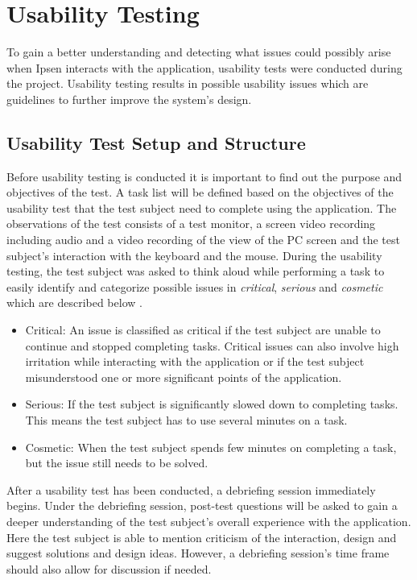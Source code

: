 \documentclass[../../master.tex]{subfiles}
\begin{document}
\section{Usability Testing} \label{sec:usabilitytesting}

To gain a better understanding and detecting what issues could possibly arise when Ipsen interacts with the application, usability tests were conducted during the project.
Usability testing results in possible usability issues which are guidelines to further improve the system's design.

\subsection{Usability Test Setup and Structure}
Before usability testing is conducted it is important to find out the purpose and objectives of the test.
A task list will be defined based on the objectives of the usability test that the test subject need to complete using the application.
The observations of the test consists of a test monitor, a screen video recording including audio and a video recording of the view of the PC screen and the test subject's interaction with the keyboard and the mouse.
During the usability testing, the test subject was asked to think aloud while performing a task to easily identify and categorize possible issues in \textit{critical}, \textit{serious} and \textit{cosmetic} which are described below \cite{brugervenligtwebdesign}.

\begin{itemize}
  	\item
  	Critical: An issue is classified as critical if the test subject are unable to continue and stopped completing tasks.
	Critical issues can also involve high irritation while interacting with the application or if the test subject misunderstood one or more significant points of the application.
  	\item
  	Serious: If the test subject is significantly slowed down to completing tasks.
	This means the test subject has to use several minutes on a task.
	\item
	Cosmetic: When the test subject spends few minutes on completing a task, but the issue still needs to be solved.
\end{itemize}

After a usability test has been conducted, a debriefing session immediately begins.
Under the debriefing session, post-test questions will be asked to gain a deeper understanding of the test subject's overall experience with the application.
Here the test subject is able to mention criticism of the interaction, design and suggest solutions and design ideas.
However, a debriefing session's time frame should also allow for discussion if needed.
\end{document}
